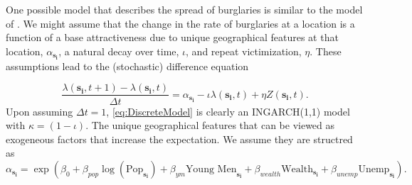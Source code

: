 \documentclass[11pt]{isuthesis}
\begin{document}
One possible model that describes the spread of burglaries is similar to the model of \cite{short2008statistical}.  We might assume that the change in the rate of burglaries at a location is a function of a base attractiveness due to unique geographical features at that location, $\alpha_{\boldsymbol{s_i}}$, a natural decay over time, $\iota$, and repeat victimization, $\eta$.  These assumptions lead to the (stochastic) difference equation

\begin{equation}
	\frac{\lambda(\boldsymbol{s_i},t+1)-\lambda(\boldsymbol{s_i},t)}{\Delta t}=\alpha_{\boldsymbol{s_i}}-\iota \lambda(\boldsymbol{s_i},t)+\eta Z(\boldsymbol{s_i},t)\label{eq:DiscreteModel}.
\end{equation}
Upon assuming $\Delta t=1$, \eqref{eq:DiscreteModel} is clearly an INGARCH(1,1) model with $\kappa=(1-\iota)$.  The unique geographical features that can be viewed as exogeneous factors that increase the expectation.  We assume they are structred as
\begin{equation}
	\alpha_{\boldsymbol{s_i}}=\exp\left(\beta_0+\beta_{pop} \log(\mbox{Pop}_{\boldsymbol{s_i}})+\beta_{ym}\mbox{Young Men}_{\boldsymbol{s_i}}+\beta_{wealth}\mbox{Wealth}_{\boldsymbol{s_i}}+\beta_{unemp}\mbox{Unemp}_{\boldsymbol{s_i}}\right) \label{eq:mean strucutre}.
\end{equation}
\end{document}
